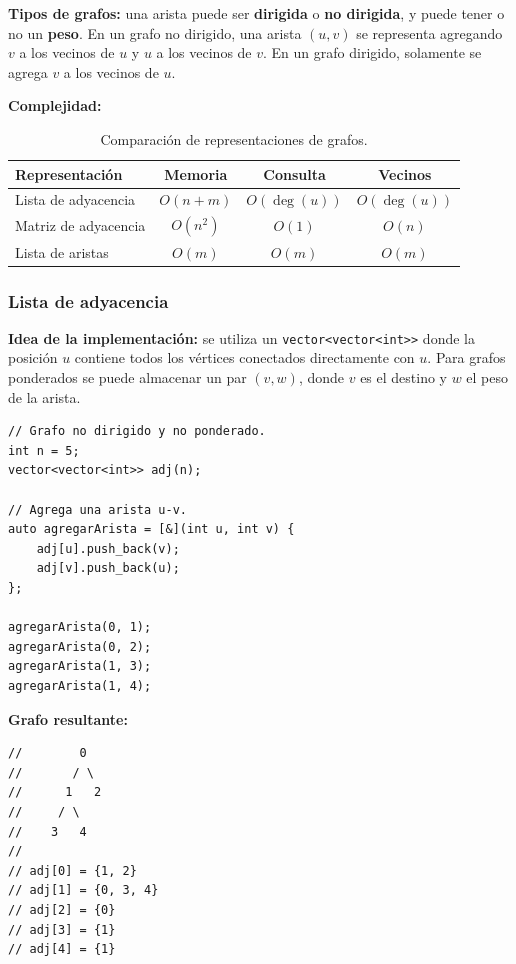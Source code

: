 \documentclass[10pt,a4paper,twocolumn]{article}
\begin{document}
\textbf{Tipos de grafos:} una arista puede ser \textbf{dirigida} o
\textbf{no dirigida}, y puede tener o no un \textbf{peso}. En un grafo
no dirigido, una arista $(u,v)$ se representa agregando $v$ a los
vecinos de $u$ y $u$ a los vecinos de $v$. En un grafo dirigido,
solamente se agrega $v$ a los vecinos de $u$.

\textbf{Complejidad:}

\begin{table}[H]
\raggedright
\scriptsize
\setlength{\tabcolsep}{2.5pt}
\renewcommand{\arraystretch}{1.1}
\begin{tabular}{|p{}|c|c|c|}
\hline
\textbf{Representación} &
\textbf{Memoria} &
\textbf{Consulta} &
\textbf{Vecinos} \\
\hline
Lista de adyacencia &
$O(n+m)$ &
$O(\deg(u))$ &
$O(\deg(u))$ \\
\hline
Matriz de adyacencia &
$O(n^2)$ &
$O(1)$ &
$O(n)$ \\
\hline
Lista de aristas &
$O(m)$ &
$O(m)$ &
$O(m)$ \\
\hline
\end{tabular}
\caption{Comparación de representaciones de grafos.}
\end{table}

\subsubsection{Lista de adyacencia}

\textbf{Idea de la implementación:} se utiliza un
\texttt{vector<vector<int>>} donde la posición $u$ contiene todos los
vértices conectados directamente con $u$. Para grafos ponderados se
puede almacenar un par $(v,w)$, donde $v$ es el destino y $w$ el peso
de la arista.

\begin{lstlisting}[style=cpp]
// Grafo no dirigido y no ponderado.
int n = 5;
vector<vector<int>> adj(n);

// Agrega una arista u-v.
auto agregarArista = [&](int u, int v) {
    adj[u].push_back(v);
    adj[v].push_back(u);
};

agregarArista(0, 1);
agregarArista(0, 2);
agregarArista(1, 3);
agregarArista(1, 4);
\end{lstlisting}

\textbf{Grafo resultante:}

\begin{lstlisting}[style=cpp]
//        0
//       / \
//      1   2
//     / \
//    3   4
//
// adj[0] = {1, 2}
// adj[1] = {0, 3, 4}
// adj[2] = {0}
// adj[3] = {1}
// adj[4] = {1}
\end{lstlisting}
\end{document}
